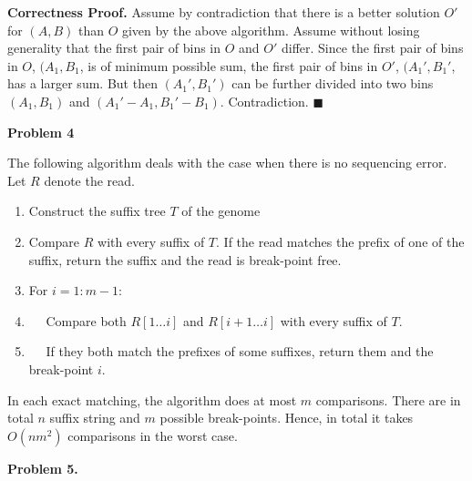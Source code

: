 \documentclass[11pt]{article}
\begin{document}
{\bf Correctness Proof. } Assume by contradiction that there is a better solution $O'$ for $(A,B)$ than $O$ given by the above algorithm. Assume without losing generality that the first pair of bins in $O$ and $O'$ differ. Since the first pair of bins in $O$, $(A_{1}, B_{1}$, is of minimum possible sum, the first pair of bins in $O'$, $(A_{1}', B_{1}'$, has a larger sum. But then $(A_{1}', B_{1}')$ can be further divided into two bins $(A_{1}, B_{1})$ and $(A_{1}' -A_{1}, B_{1}'-B_{1})$. Contradiction. $\blacksquare$

{\bf Problem 4}

The following algorithm deals with the case when there is no sequencing error. Let $R$ denote the read.
\begin{enumerate}
\item Construct the suffix tree $T$ of the genome
\item Compare $R$ with every suffix of $T$. If the read matches the prefix of one of the suffix, return the suffix and the read is break-point free.
\item For $i= 1: m-1$:
\item $\quad$ Compare both $R[1 \dots i]$ and $R[i+1 \dots i]$ with every suffix of $T$. 
\item $\quad$ If they both match the prefixes of some suffixes, return them and the break-point $i$.
\end{enumerate}
In each exact matching, the algorithm does at most $m$ comparisons. There are in total $n$ suffix string and $m$ possible break-points. Hence, in total it takes $O(nm^{2})$ comparisons in the worst case.

{\bf Problem 5. }
\end{document}
